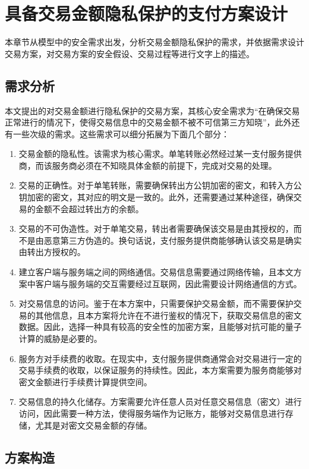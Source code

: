\chapter{具备交易金额隐私保护的支付方案设计}

本章节从模型中的安全需求出发，分析交易金额隐私保护的需求，并依据需求设计交易方案，对交易方案的安全假设、交易过程等进行文字上的描述。

\section{需求分析}

本文提出的对交易金额进行隐私保护的交易方案，其核心安全需求为“在确保交易正常进行的情况下，使得交易信息中的交易金额不被不可信第三方知晓”，此外还有一些次级的需求。这些需求可以细分拓展为下面几个部分：

\begin{enumerate}
    \item 交易金额的隐私性。该需求为核心需求。单笔转账必然经过某一支付服务提供商，而该服务商必须在不知晓具体金额的前提下，完成对交易的处理。
    \item 交易的正确性。对于单笔转账，需要确保转出方公钥加密的密文，和转入方公钥加密的密文，其对应的明文是一致的。此外，还需要通过某种途径，确保交易的金额不会超过转出方的余额。
    \item 交易的不可伪造性。对于单笔交易，转出者需要确保该交易是由其授权的，而不是由恶意第三方伪造的。换句话说，支付服务提供商能够确认该交易是确实由转出方授权的。
    \item 建立客户端与服务端之间的网络通信。交易信息需要通过网络传输，且本文方案中客户端与服务端的交互需要经过互联网，因此需要设计网络通信的方式。
    \item 对交易信息的访问。鉴于在本方案中，只需要保护交易金额，而不需要保护交易的其他信息，且本方案将允许在不进行鉴权的情况下，获取交易信息的密文数据。因此，选择一种具有较高的安全性的加密方案，且能够对抗可能的量子计算的威胁是必要的。
    \item 服务方对手续费的收取。在现实中，支付服务提供商通常会对交易进行一定的交易手续费的收取，以保证服务的持续性。因此，本方案需要为服务商能够对密文金额进行手续费计算提供空间。
    \item 交易信息的持久化储存。方案需要允许任意人员对任意交易信息（密文）进行访问，因此需要一种方法，使得服务端作为记账方，能够对交易信息进行存储，尤其是对密文交易金额的存储。
\end{enumerate}

\section{方案构造}


